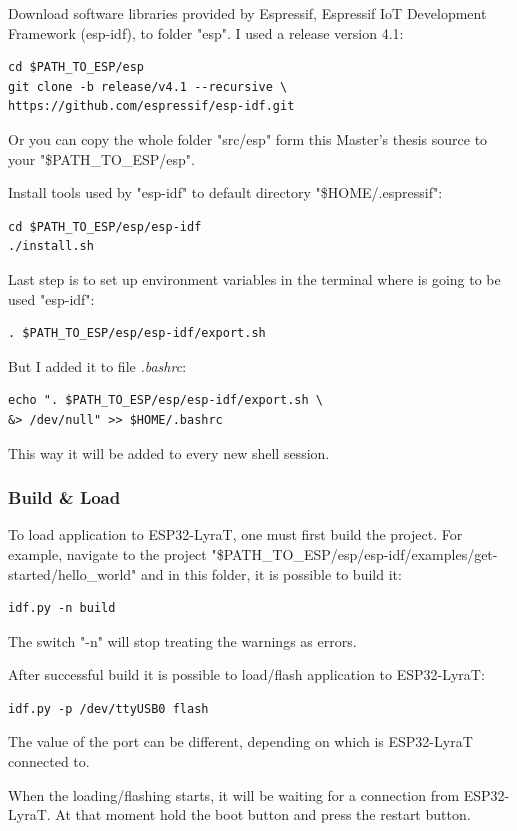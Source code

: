 \documentclass[thesis=M,english]{FITthesis}[2019/12/23]
\begin{document}
\bigskip
\noindent
Download software libraries provided by Espressif, Espressif IoT Development Framework (esp-idf), to folder "esp". I used a release version 4.1:
\begin{lstlisting}[frame=single]
cd $PATH_TO_ESP/esp
git clone -b release/v4.1 --recursive \
https://github.com/espressif/esp-idf.git
\end{lstlisting}
Or you can copy the whole folder "src/esp" form this Master's thesis source to your "\$PATH\_TO\_ESP/esp".

\bigskip
\noindent
Install tools used by "esp-idf" to default directory "\$HOME/.espressif":
\begin{lstlisting}[frame=single]
cd $PATH_TO_ESP/esp/esp-idf
./install.sh
\end{lstlisting}

\bigskip
\noindent
Last step is to set up environment variables in the terminal where is going to be used "esp-idf":
\begin{lstlisting}[frame=single]
. $PATH_TO_ESP/esp/esp-idf/export.sh
\end{lstlisting}
But I added it to file \textit{.bashrc}:
\begin{lstlisting}[frame=single]
echo ". $PATH_TO_ESP/esp/esp-idf/export.sh \
&> /dev/null" >> $HOME/.bashrc
\end{lstlisting}
This way it will be added to every new shell session.

\subsubsection{Build \& Load}
To load application to ESP32-LyraT, one must first build the project. For example, navigate to the project "\$PATH\_TO\_ESP/esp/esp-idf/examples/get-started/hello\_world" and in this folder, it is possible to build it:
\begin{lstlisting}[frame=single]
idf.py -n build
\end{lstlisting}
The switch "-n" will stop treating the warnings as errors.

\bigskip
\noindent
After successful build it is possible to load/flash application to ESP32-LyraT:
\begin{lstlisting}[frame=single]
idf.py -p /dev/ttyUSB0 flash
\end{lstlisting}
The value of the port can be different, depending on which is ESP32-LyraT connected to.

\bigskip
\noindent
When the loading/flashing starts, it will be waiting for a connection from ESP32-LyraT. At that moment hold the boot button and press the restart button.
\end{document}
